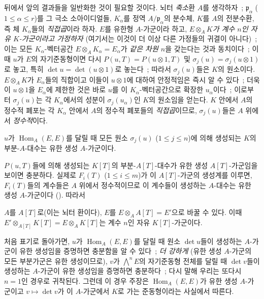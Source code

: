\begin{remark}[6.4.7]
\label{II.6.4.7-ko}
뒤에서 앞의 결과들을 일반화한 것이 필요할 것이다. 뇌터
\emph{축소}환 $A$를 생각하자~; $\mathfrak{p}_\alpha$
($1\leq\alpha\leq r$)를 그 극소 소아이디얼들, $K_\alpha$를 정역
$A/\mathfrak{p}_\alpha$의 분수체, $K$를 $A$의 전분수환, 즉 체
$K_\alpha$들의 \emph{직접곱}이라 하자. $E$를 유한형 $A$-가군이라
하고, \emph{$E\otimes_AK$가 계수 $n$인 자유 $K$-가군이라고 가정하자}
(여기서는 이것이 더 이상 다른 가정들의 귀결이 아니다)~; 이는 모든
$K_\alpha$-벡터공간 $E\otimes_AK_\alpha=E_\alpha$가 \emph{같은 차원
$n$}을 갖는다는 것과 동치이다~; 이때 $u$가 $E$의 자기준동형이면 다시
$P(u,T)=P(u\otimes1,T)$ 및 $\sigma_j(u)=\sigma_j(u\otimes1)$로 놓고,
특히 $\det u=\det(u\otimes1)$로 놓는다~; 따라서 $\sigma_j(u)$들은
$K$의 원소이다. $E\otimes_AK$가 $E_\alpha$들의 직합이고 이들이
$u\otimes1$에 대하여 안정적임은 즉시 알 수 있다~; 더욱이
$u\otimes1$을 $E_\alpha$에 제한한 것은 바로 $u$를 이
$K_\alpha$-벡터공간으로 확장한 $u_\alpha$이다~; 이로부터
$\sigma_j(u)$는 각 $K_\alpha$에서의 성분이 $\sigma_j(u_\alpha)$인
$K$의 원소임을 얻는다. $K$ 안에서 $A$의 정수적 폐포는 각
$K_\alpha$ 안에서 $A$의 정수적 폐포들의 \emph{직접곱}이므로,
$\sigma_j(u)$들은 $A$ 위에서 \emph{정수적}이다.

\begin{lemma}[6.4.7.1]
\label{II.6.4.7.1-ko}
$u$가 $\operatorname{Hom}_A(E,E)$를 달릴 때 모든 원소 $\sigma_j(u)$
($1\leq j\leq n$)에 의해 생성되는 $K$의 부분-$A$-대수는 유한 생성
$A$-가군이다.
\end{lemma}

$P(u,T)$들에 의해 생성되는 $K[T]$의 부분-$A[T]$-대수가 유한 생성
$A[T]$-가군임을 보이면 충분하다. 실제로 $F_i(T)$ ($1\leq i\leq m$)가
이 $A[T]$-가군의 생성계를 이루면, $F_i(T)$들의 계수들은 $A$ 위에서
정수적이므로 이 계수들이 생성하는 $A$-대수는 유한 생성 $A$-가군이다
(\cite[t.~I, p.~255, th.~1]{I-13}). 따라서


$A$를 $A[T]$로(이는 뇌터 환이다), $E$를
$E\otimes_AA[T]=E'$으로 바꿀 수 있다. 이때
$E'\otimes_{A[T]}K[T]=E\otimes_AK[T]$는 계수 $n$인 자유
$K[T]$-가군이다.

처음 표기로 돌아가면, $u$가 $\operatorname{Hom}_A(E,E)$를 달릴 때
원소 $\det u$들이 생성하는 $A$-가군이 유한 생성임을 증명하면 충분함을
알 수 있다~; \emph{더 강하게} (유한 생성 $A$-가군의 모든 부분가군은
유한 생성이므로), $v$가 $\bigwedge^nE$의 자기준동형 전체를 달릴 때
$\det v$들이 생성하는 $A$-가군이 유한 생성임을 증명하면 충분하다~;
다시 말해 우리는 또다시 $n=1$인 경우로 귀착된다. 그런데 이 경우 주장은
$\operatorname{Hom}_A(E,E)$가 유한 생성 $A$-가군이고
$v\mapsto\det v$가 이 $A$-가군에서 $K$로 가는 준동형이라는 사실에서
따른다.


\end{remark}
